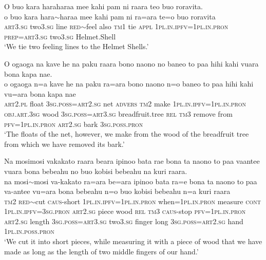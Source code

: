 \ea\label{ex:text20-31}
O buo kara haraharaa mee kahi pam ni raara teo buo roravita.\\
\gll o	buo	kara	hara{$\sim$}haraa	mee	kahi	pam	ni	ra=ara	te=o	buo	roravita\\
     \textsc{art}3.\textsc{sg}	two3.\textsc{sg}	line	\textsc{red}{$\sim$}feel	also	\textsc{tm}1	tie	\textsc{appl}	1\textsc{pl}.\textsc{in}.\textsc{ipfv}=1\textsc{pl}.\textsc{in}.\textsc{pron}	\textsc{prep}=\textsc{art}3.\textsc{sg}	two3.\textsc{sg}	Helmet.Shell\\
\glt `We tie two feeling lines to the Helmet Shells.'
\z

\ea\label{ex:text20-32}
O ogaoga na kave he na paku raara bono naono no baneo to paa hihi kahi vuara bona kapa nae.\\
\gll o	ogaoga	n=a	kave	he	na	paku	ra=ara	bono	naono	n=o	baneo	to	paa	hihi	kahi	vu=ara	bona	kapa	nae\\
     \textsc{art}2.\textsc{pl}	float	3\textsc{sg}.\textsc{poss}=\textsc{art}2.\textsc{sg}	net	\textsc{advers}	\textsc{tm}2	make	1\textsc{pl}.\textsc{in}.\textsc{ipfv}=1\textsc{pl}.\textsc{in}.\textsc{pron}	\textsc{obj}.\textsc{art}.3\textsc{sg}	wood	3\textsc{sg}.\textsc{poss}=\textsc{art}3.\textsc{sg}	breadfruit.tree	\textsc{rel}	\textsc{tm}3	remove	from	\textsc{pfv}=1\textsc{pl}.\textsc{in}.\textsc{pron}	\textsc{art}2.\textsc{sg}	bark	3\textsc{sg}.\textsc{poss}.\textsc{pron}\\
\glt `The floats of the net, however, we make from the wood of the breadfruit tree from which we have removed its bark.'
\z

\ea\label{ex:text20-33}
Na mosimosi vakakato raara beara ipinoo bata rae bona ta naono to paa vaantee vuara bona bebeahu no buo kobisi bebeahu na kuri raara.\\
\gll na	mosi{$\sim$}mosi	va-kakato	ra=ara	be=ara	ipinoo	bata	ra=e	bona	ta	naono	to	paa	va-antee	vu=ara	bona	bebeahu	n=o	buo	kobisi	bebeahu	n=a	kuri	raara\\
     \textsc{tm}2	\textsc{red}{$\sim$}cut	\textsc{caus}-short	1\textsc{pl}.\textsc{in}.\textsc{ipfv}=1\textsc{pl}.\textsc{in}.\textsc{pron}	when=1\textsc{pl}.\textsc{in}.\textsc{pron}	measure	\textsc{cont}	1\textsc{pl}.\textsc{in}.\textsc{ipfv}=3\textsc{sg}.\textsc{pron}	\textsc{art}2.\textsc{sg}	piece	wood	\textsc{rel}	\textsc{tm}3	\textsc{caus}-stop	\textsc{pfv}=1\textsc{pl}.\textsc{in}.\textsc{pron}	\textsc{art}2.\textsc{sg}	length	3\textsc{sg}.\textsc{poss}=\textsc{art}3.\textsc{sg}	two3.\textsc{sg}	finger	long	3\textsc{sg}.\textsc{poss}=\textsc{art}2.\textsc{sg}	hand	1\textsc{pl}.\textsc{in}.\textsc{poss}.\textsc{pron}\\
\glt `We cut it into short pieces, while measuring it with a piece of wood that we have made as long as the length of two middle fingers of our hand.'
\z

